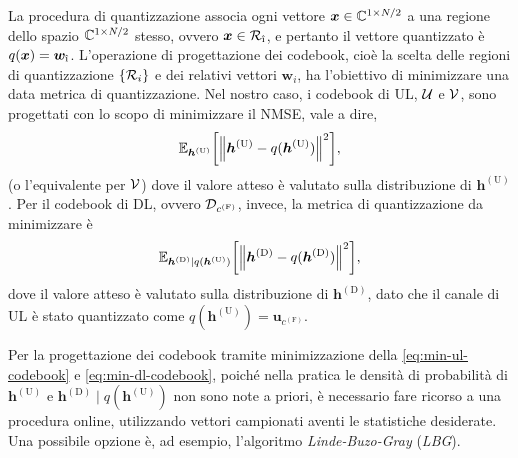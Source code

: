 La procedura di quantizzazione associa ogni vettore \(\bm{x} \in \mathbb{C}^{1 \times
N/2}\) a una regione dello spazio \(\mathbb{C}^{1 \times N/2}\) stesso, ovvero \(\bm{x}
\in \set{R}_{\ihat}\), e pertanto il vettore quantizzato è \(q(\bm{x}) =
\bm{w}_{\ihat}\). L'operazione di progettazione dei codebook, cioè la scelta
delle regioni di quantizzazione \(\{\mathcal{R}_i\}\) e dei relativi vettori
\(\bm{w}_i\), ha l'obiettivo di minimizzare una data metrica di quantizzazione.
Nel nostro caso, i codebook di UL, \(\mathcal{U}\) e \(\mathcal{V}\), sono progettati
con lo scopo di minimizzare il NMSE, vale a dire,
\begin{equation}
    \expect[\bm{h}^\mathrm{(U)}]{
        \lnorm \bm{h}^\mathrm{(U)} - q(\bm{h}^\mathrm{(U)}) \rnorm^2
    }, \label{eq:min-ul-codebook}
\end{equation}
(o l'equivalente per \(\mathcal{V}\)) dove il valore atteso è valutato sulla
distribuzione di \(\bm{h}^\mathrm{(U)}\). Per il codebook di DL, ovvero
\(\mathcal{D}_{c^\mathrm{(F)}}\), invece, la metrica di quantizzazione da
minimizzare è
\begin{equation}
    \expect[\bm{h}^\mathrm{(D)} \mid q(\bm{h}^\mathrm{(U)})]{
        \lnorm \bm{h}^\mathrm{(D)} - q(\bm{h}^\mathrm{(D)}) \rnorm^2
    }, \label{eq:min-dl-codebook}
\end{equation}
dove il valore atteso è valutato sulla distribuzione di
\(\bm{h}^\mathrm{(D)}\), dato che il canale di UL è stato quantizzato come
\(q(\bm{h}^\mathrm{(U)}) = \bm{u}_{c^\mathrm{(F)}}\).

Per la progettazione dei codebook tramite minimizzazione della
\eqref{eq:min-ul-codebook} e \eqref{eq:min-dl-codebook}, poiché nella pratica
le densità di probabilità di \(\bm{h}^\mathrm{(U)}\) e \(\bm{h}^\mathrm{(D)}
\mid q(\bm{h}^\mathrm{(U)})\) non sono note a priori, è necessario fare ricorso
a una procedura online, utilizzando vettori campionati aventi le statistiche
desiderate. Una possibile opzione è, ad esempio, l'algoritmo
\textit{Linde-Buzo-Gray} (\textit{LBG}).\cite{1094577}
